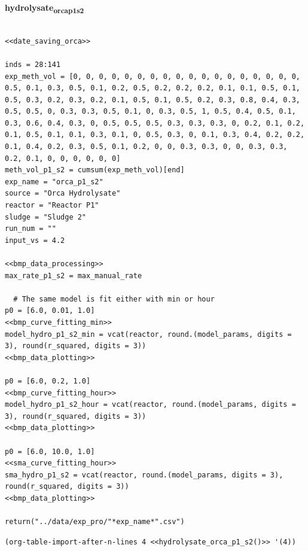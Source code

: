 \documentclass[11pt]{article}
\begin{document}
\textbf{hydrolysate\textsubscript{orca}\textsubscript{p1}\textsubscript{s2}}
\begin{verbatim}

<<date_saving_orca>>

inds = 28:141
exp_meth_vol = [0, 0, 0, 0, 0, 0, 0, 0, 0, 0, 0, 0, 0, 0, 0, 0, 0, 0, 0.5, 0.1, 0.3, 0.5, 0.1, 0.2, 0.5, 0.2, 0.2, 0.2, 0.1, 0.1, 0.5, 0.1, 0.5, 0.3, 0.2, 0.3, 0.2, 0.1, 0.5, 0.1, 0.5, 0.2, 0.3, 0.8, 0.4, 0.3, 0.5, 0.5, 0, 0.3, 0.3, 0.5, 0.1, 0, 0.3, 0.5, 1, 0.5, 0.4, 0.5, 0.1, 0.3, 0.6, 0.4, 0.3, 0, 0.5, 0.5, 0.5, 0.3, 0.3, 0.3, 0, 0.2, 0.1, 0.2, 0.1, 0.5, 0.1, 0.1, 0.3, 0.1, 0, 0.5, 0.3, 0, 0.1, 0.3, 0.4, 0.2, 0.2, 0.1, 0.4, 0.2, 0.3, 0.5, 0.1, 0.2, 0, 0, 0.3, 0.3, 0, 0, 0.3, 0.3, 0.2, 0.1, 0, 0, 0, 0, 0, 0] 
meth_vol_p1_s2 = cumsum(exp_meth_vol)[end]
exp_name = "orca_p1_s2"
source = "Orca Hydrolysate"
reactor = "Reactor P1"
sludge = "Sludge 2"
run_num = ""
input_vs = 4.2

<<bmp_data_processing>>
max_rate_p1_s2 = max_manual_rate

  # The same model is fit either with min or hour
p0 = [6.0, 0.01, 1.0]
<<bmp_curve_fitting_min>>
model_hydro_p1_s2_min = vcat(reactor, round.(model_params, digits = 3), round(r_squared, digits = 3))
<<bmp_data_plotting>>

p0 = [6.0, 0.2, 1.0]
<<bmp_curve_fitting_hour>>
model_hydro_p1_s2_hour = vcat(reactor, round.(model_params, digits = 3), round(r_squared, digits = 3))
<<bmp_data_plotting>>

p0 = [6.0, 10.0, 1.0]
<<sma_curve_fitting_hour>>
sma_hydro_p1_s2 = vcat(reactor, round.(model_params, digits = 3), round(r_squared, digits = 3))
<<bmp_data_plotting>>

return("../data/exp_pro/"*exp_name*".csv")

\end{verbatim}

\begin{verbatim}
(org-table-import-after-n-lines 4 <<hydrolysate_orca_p1_s2()>> '(4))
\end{verbatim}
\end{document}
